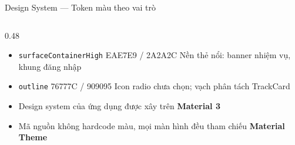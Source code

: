 \begin{frame}{Design System --- Token màu theo vai trò}
\begin{columns}[T]
\begin{column}{0.48\textwidth}
{\begin{itemize}
\item {} \texttt{surfaceContainerHigh} EAE7E9 / 2A2A2C \newline Nền thẻ nổi: banner nhiệm vụ, khung đăng nhập
\item {} \texttt{outline} 76777C / 909095 \newline Icon radio chưa chọn; vạch phân tách TrackCard
\end{itemize}}
\vspace{1.5mm}
{\tiny
\begin{itemize}\setlength{\itemsep}{3pt}
\item Design system của ứng dụng được xây trên \textbf{Material 3}
\item Mã nguồn không hardcode màu, mọi màn hình đều tham chiếu \textbf{Material Theme}
\end{itemize}}
\end{column}
\end{columns}
\end{frame}

